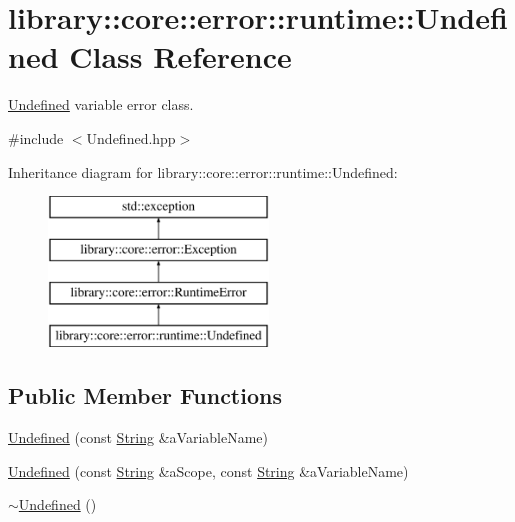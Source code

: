\hypertarget{classlibrary_1_1core_1_1error_1_1runtime_1_1_undefined}{}\section{library\+:\+:core\+:\+:error\+:\+:runtime\+:\+:Undefined Class Reference}
\label{classlibrary_1_1core_1_1error_1_1runtime_1_1_undefined}


\hyperlink{classlibrary_1_1core_1_1error_1_1runtime_1_1_undefined}{Undefined} variable error class.  




{\ttfamily \#include $<$Undefined.\+hpp$>$}

Inheritance diagram for library\+:\+:core\+:\+:error\+:\+:runtime\+:\+:Undefined\+:\begin{figure}[H]
\begin{center}
\leavevmode
\includegraphics[height=4.000000cm]{classlibrary_1_1core_1_1error_1_1runtime_1_1_undefined}
\end{center}
\end{figure}
\subsection*{Public Member Functions}
\begin{DoxyCompactItemize}
\item 
\hyperlink{classlibrary_1_1core_1_1error_1_1runtime_1_1_undefined_a585cecbe505147926980971fed942b95}{Undefined} (const \hyperlink{classlibrary_1_1core_1_1types_1_1_string}{String} \&a\+Variable\+Name)
\item 
\hyperlink{classlibrary_1_1core_1_1error_1_1runtime_1_1_undefined_a61e341571e36a63bd0894c82b6be7427}{Undefined} (const \hyperlink{classlibrary_1_1core_1_1types_1_1_string}{String} \&a\+Scope, const \hyperlink{classlibrary_1_1core_1_1types_1_1_string}{String} \&a\+Variable\+Name)
\item 
\hyperlink{classlibrary_1_1core_1_1error_1_1runtime_1_1_undefined_a9069574e62bbe7aabab0519b6052cb69}{$\sim$\+Undefined} ()
\end{DoxyCompactItemize}


